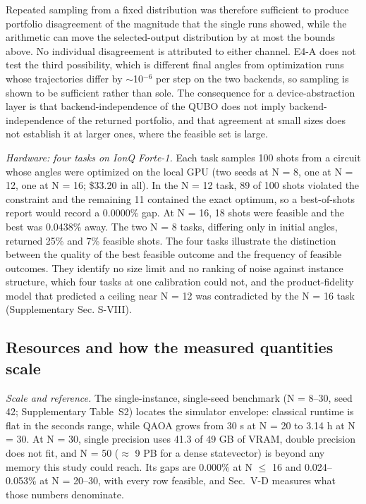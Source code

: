 \documentclass[journal]{IEEEtran}
\begin{document}
Repeated sampling from a fixed distribution was therefore sufficient to produce portfolio disagreement of the magnitude that the single runs showed, while the arithmetic can move the selected-output distribution by at most the bounds above. No individual disagreement is attributed to either channel. E4-A does not test the third possibility, which is different final angles from optimization runs whose trajectories differ by $\sim$10$^{-6}$ per step on the two backends, so sampling is shown to be sufficient rather than sole. The consequence for a device-abstraction layer is that backend-independence of the QUBO does not imply backend-independence of the returned portfolio, and that agreement at small sizes does not establish it at larger ones, where the feasible set is large.


\textit{Hardware: four tasks on IonQ Forte-1.} Each task samples 100 shots from a circuit whose angles were optimized on the local GPU (two seeds at N = 8, one at N = 12, one at N = 16; \$33.20 in all). In the N = 12 task, 89 of 100 shots violated the constraint and the remaining 11 contained the exact optimum, so a best-of-shots report would record a 0.0000\% gap. At N = 16, 18 shots were feasible and the best was 0.0438\% away. The two N = 8 tasks, differing only in initial angles, returned 25\% and 7\% feasible shots. The four tasks illustrate the distinction between the quality of the best feasible outcome and the frequency of feasible outcomes. They identify no size limit and no ranking of noise against instance structure, which four tasks at one calibration could not, and the product-fidelity model that predicted a ceiling near N = 12 was contradicted by the N = 16 task (Supplementary Sec. S-VIII).


\subsection{Resources and how the measured quantities scale}


\textit{Scale and reference.} The single-instance, single-seed benchmark (N = 8--30, seed 42; Supplementary Table~S2) locates the simulator envelope: classical runtime is flat in the seconds range, while QAOA grows from 30 s at N = 20 to 3.14 h at N = 30. At N = 30, single precision uses 41.3 of 49 GB of VRAM, double precision does not fit, and N = 50 ($\approx$ 9 PB for a dense statevector) is beyond any memory this study could reach. Its gaps are 0.000\% at N $\leq$ 16 and 0.024--0.053\% at N = 20--30, with every row feasible, and Sec.~V-D measures what those numbers denominate.
\end{document}

